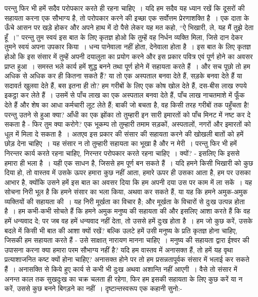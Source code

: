 परन्तु फिर भी हमें सदैव परोपकार करते ही रहना चाहिए~। यदि हम सदैव यह ध्यान रखें कि दूसरों की सहायता करना एक सौभाग्य है, तो परोपकार करने की इच्छा एक सर्वोत्तम प्रेरणाशक्ति है~। एक दाता के ऊँचे आसन पर खड़े होकर और अपने हाथ में दो पैसे लेकर यह मत कहो, “ऐ भिखारी, ले, यह मैं तुझे देता हूँ~।” परन्तु तुम स्वयं इस बात के लिए कृतज्ञ होओ कि तुम्हें वह निर्धन व्यक्ति मिला, जिसे दान देकर तुमने स्वयं अपना उपकार किया~। धन्य पानेवाला नहीं होता, देनेवाला होता है~। इस बात के लिए कृतज्ञ होओ कि इस संसार में तुम्हें अपनी दयालुता का प्रयोग करने और इस प्रकार पवित्र एवं पूर्ण होने का अवसर प्राप्त हुआ~। समस्त भले कार्य हमें शुद्ध बनने तथा पूर्ण होने में सहायता करते हैं~। और सच पूछो तो हम अधिक से अधिक कर ही कितना सकते हैं? या तो एक अस्पताल बनवा देते हैं, सड़के बनवा देते हैं या सदावर्त खुलवा देते हैं, बस इतना ही तो? हम गरीबों के लिए एक कोष खोल देते हैं, दस-बीस लाख रुपये इकट्ठा कर लेते हैं~। उसमें से पाँच लाख का एक अस्पताल बनवा देते हैं, पाँच लाख नाचतमाशे में फूँक देते हैं और शेष का आधा कर्मचारी लूट लेते हैं; बाकी जो बचता है, वह किसी तरह गरीबों तक पहुँचता है! परन्तु उतने से हुआ क्या? आँधी का एक झोंका तो तुम्हारी इन सारी इमारतों को पाँच मिनट में नष्ट कर दे सकता है - फिर तुम क्या करोगे? एक भूकम्प तो तुम्हारी तमाम सड़कों, अस्पतालों, नगरों और इमारतों को धूल में मिला दे सकता है~। अतएव इस प्रकार की संसार की सहायता करने की खोखली बातों को हमें छोड़ देना चाहिए~। यह संसार न तो तुम्हारी सहायता का भूखा है और न मेरी~। परन्तु फिर भी हमें निरन्तर कार्य करते रहना चाहिए, निरन्तर परोपकार करते रहना चाहिए~। क्यों? - इसलिए कि इससे हमारा ही भला है~। यही एक साधन है, जिससे हम पूर्ण बन सकते हैं~। यदि हमने किसी भिखारी को कुछ दिया हो, तो वास्तव में उसके ऊपर हमारा कुछ नहीं आता, हमारे ऊपर ही उसका आता है, हम पर उसका आभार है, क्योंकि उसने हमें इस बात का अवसर दिया कि हम अपनी दया उस पर काम में ला सकें~। यह सोचना निरी भूल है कि हमने संसार का भला किया, अथवा कर सकते हैं, या यह कि हमने अमुक-अमुक व्यक्तियों की सहायता की~। यह निरी मूर्खता का विचार है; और मूर्खता के विचारों से दुःख उत्पन्न होता है~। हम कभी-कभी सोचते हैं कि हमने अमुक मनुष्य की सहायता की और इसलिए आशा करते हैं कि वह हमें धन्यवाद दे; पर जब वह हमें धन्यवाद नहीं देता, तो उससे हमें दुःख होता है~। हम जो कुछ करें, उसके बदले में किसी भी बात की आशा क्यों रखें? बल्कि उलटे हमें उसी मनुष्य के प्रति कृतज्ञ होना चाहिए, जिसकी हम सहायता करते हैं - उसे साक्षात् नारायण मानना चाहिए~। मनुष्य की सहायता द्वारा ईश्वर की उपासना करना क्या हमारा परम सौभाग्य नहीं है? यदि हम वास्तव में अनासक्त हैं, तो हमें यह वृथा प्रत्याशाजनित कष्ट क्यों होना चाहिए? अनासक्त होने पर तो हम प्रसन्नतापूर्वक संसार में भलाई कर सकते हैं~। अनासक्ति से किये हुए कार्य से कभी भी दुःख अथवा अशान्ति नहीं आएगी~। वैसे तो संसार में अनन्त काल तक सुखदुःख का चक्र चलता ही रहेगा, फिर हम इसकी सहायता के लिए कुछ करें या न करें, उससे कुछ बनने बिगड़ने का नहीं~। दृष्टान्तस्वरूप एक कहानी सुनो:-

